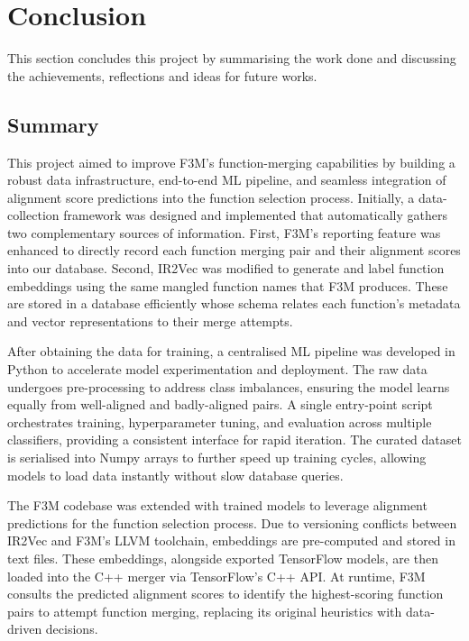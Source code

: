 \chapter{Conclusion}
This section concludes this project by summarising the work done and discussing the achievements, reflections and ideas for future works.

\section{Summary} \label{Conc:Summary}
This project aimed to improve F3M’s function-merging capabilities by building a robust data infrastructure, end-to-end ML pipeline, and seamless integration of alignment score predictions into the function selection process. Initially, a data-collection framework was designed and implemented that automatically gathers two complementary sources of information. First, F3M’s reporting feature was enhanced to directly record each function merging pair and their alignment scores into our database. Second, IR2Vec was modified to generate and label function embeddings using the same mangled function names that F3M produces. These are stored in a database efficiently whose schema relates each function’s metadata and vector representations to their merge attempts.

After obtaining the data for training, a centralised ML pipeline was developed in Python to accelerate model experimentation and deployment. The raw data undergoes pre-processing to address class imbalances, ensuring the model learns equally from well-aligned and badly-aligned pairs. A single entry-point script orchestrates training, hyperparameter tuning, and evaluation across multiple classifiers, providing a consistent interface for rapid iteration. The curated dataset is serialised into Numpy arrays to further speed up training cycles, allowing models to load data instantly without slow database queries.

The F3M codebase was extended with trained models to leverage alignment predictions for the function selection process. Due to versioning conflicts between IR2Vec and F3M’s LLVM toolchain, embeddings are pre-computed and stored in text files. These embeddings, alongside exported TensorFlow models, are then loaded into the C++ merger via TensorFlow’s C++ API. At runtime, F3M consults the predicted alignment scores to identify the highest-scoring function pairs to attempt function merging, replacing its original heuristics with data-driven decisions.

